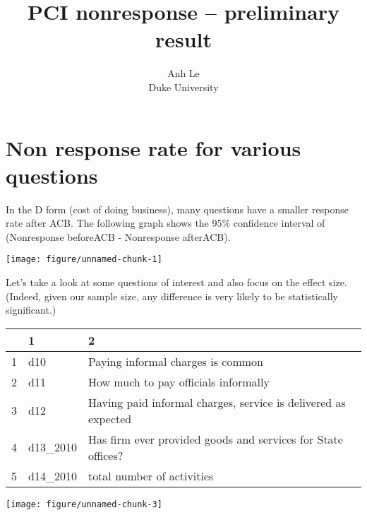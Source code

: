 \documentclass{article}\usepackage[]{graphicx}\usepackage[]{color}
\title{PCI nonresponse -- preliminary result}
\author{Anh Le \\
        Duke University}
\makeatletter
\def\maxwidth{ %
  \ifdim\Gin@nat@width>\linewidth
    \linewidth
  \else
    \Gin@nat@width
  \fi
}
\newenvironment{knitrout}{}{} %
\makeatother
\begin{document}
\maketitle



\section{Non response rate for various questions}
In the D form (cost of doing business), many questions have a smaller response rate after ACB. The following graph shows the 95\% confidence interval of (Nonresponse beforeACB - Nonresponse afterACB).

\begin{knitrout}
\color{fgcolor}

{\centering \texttt{[image: figure/unnamed-chunk-1]} 

}



\end{knitrout}

Let's take a look at some questions of interest and also focus on the effect size. (Indeed, given our sample size, any difference is very likely to be statistically significant.)

\begin{table}[ht]
\centering
\begin{tabular}{rll}
  \hline
 & 1 & 2 \\ 
  \hline
1 & d10 & Paying informal charges is common \\ 
  2 & d11 & How much to pay officials informally \\ 
  3 & d12 & Having paid informal charges, service is delivered as expected \\ 
  4 & d13\_2010 & Has firm ever provided goods and services for State offices? \\ 
  5 & d14\_2010 & total number of activities \\ 
   \hline
\end{tabular}
\end{table}


\begin{knitrout}
\color{fgcolor}

{\centering \texttt{[image: figure/unnamed-chunk-3]} 

}



\end{knitrout}
\end{document}
